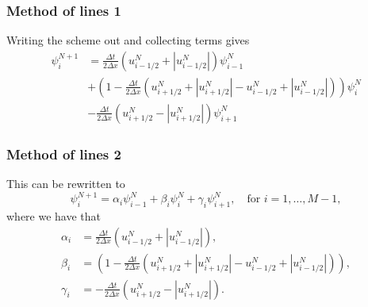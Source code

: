 \documentclass[hyperref={pdfstartview=Fit}]{beamer}
\providecommand{\abs}[1]{\left\lvert#1\right\rvert}
\begin{document}
\begin{frame}
\frametitle{Method of lines 1}
Writing the scheme out and collecting terms gives
\begin{equation*}
\begin{split}
\psi_i^{N+1} &=
\frac{\Delta t}{2 \Delta x} \left( u_{i-1/2}^N + \abs{u_{i-1/2}^N} \right) \psi_{i-1}^N\\
&+ \left(1 - \frac{\Delta t}{2 \Delta x} \left( u_{i+1/2}^N + \abs{u_{i+1/2}^N} - u_{i-1/2}^N + \abs{u_{i-1/2}^N} \right) \right) \psi_i^N\\
&-\frac{\Delta t}{2 \Delta x} \left( u_{i+1/2}^N - \abs{u_{i+1/2}^N} \right) \psi_{i+1}^N
\end{split}
\end{equation*}
\end{frame}

\begin{frame}
\frametitle{Method of lines 2}
This can be rewritten to 
\begin{equation*}
\psi_i^{N+1} = \alpha_i \psi_{i-1}^N + \beta_i \psi_i^N +\gamma_i \psi_{i+1}^N, \quad \text{for } i=1,\ldots,M-1,
\end{equation*}
 where we have that
\begin{align*}
\alpha_i &= \frac{\Delta t}{2 \Delta x} \left( u_{i-1/2}^N + \abs{u_{i-1/2}^N} \right),\\
 \beta_i &= \left(1 - \frac{\Delta t}{2 \Delta x} \left( u_{i+1/2}^N + \abs{u_{i+1/2}^N} - u_{i-1/2}^N + \abs{u_{i-1/2}^N} \right) \right),\\
\gamma_i &= -\frac{\Delta t}{2 \Delta x} \left( u_{i+1/2}^N - \abs{u_{i+1/2}^N} \right).
\end{align*}
\end{frame}
\end{document}
